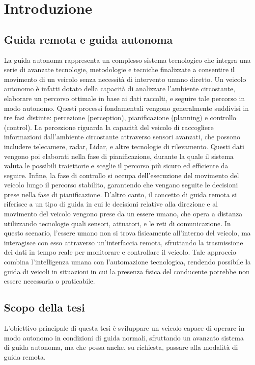 \section{Introduzione}
\subsection{Guida remota e guida autonoma}
La guida autonoma rappresenta un complesso sistema tecnologico che integra una serie di avanzate tecnologie, metodologie e tecniche finalizzate a consentire il movimento di un veicolo senza necessità di intervento umano diretto. Un veicolo autonomo è infatti dotato della capacità di analizzare l'ambiente circostante, elaborare un percorso ottimale in base ai dati raccolti, e seguire tale percorso in modo autonomo. Questi processi fondamentali vengono generalmente suddivisi in tre fasi distinte: percezione (perception), pianificazione (planning) e controllo (control).
La percezione riguarda la capacità del veicolo di raccogliere informazioni dall'ambiente circostante attraverso sensori avanzati, che possono includere telecamere, radar, Lidar, e altre tecnologie di rilevamento. Questi dati vengono poi elaborati nella fase di pianificazione, durante la quale il sistema valuta le possibili traiettorie e sceglie il percorso più sicuro ed efficiente da seguire. Infine, la fase di controllo si occupa dell'esecuzione del movimento del veicolo lungo il percorso stabilito, garantendo che vengano seguite le decisioni prese nella fase di pianificazione.
D'altro canto, il concetto di guida remota si riferisce a un tipo di guida in cui le decisioni relative alla direzione e al movimento del veicolo vengono prese da un essere umano, che opera a distanza utilizzando tecnologie quali sensori, attuatori, e le reti di comunicazione. In questo scenario, l'essere umano non si trova fisicamente all'interno del veicolo, ma interagisce con esso attraverso un'interfaccia remota, sfruttando la trasmissione dei dati in tempo reale per monitorare e controllare il veicolo. Tale approccio combina l'intelligenza umana con l'automazione tecnologica, rendendo possibile la guida di veicoli in situazioni in cui la presenza fisica del conducente potrebbe non essere necessaria o praticabile.

\subsection{Scopo della tesi}
L'obiettivo principale di questa tesi è sviluppare un veicolo capace di operare in modo autonomo in condizioni di guida normali, sfruttando un avanzato sistema di guida autonoma, ma che possa anche, su richiesta, passare alla modalità di guida remota.

